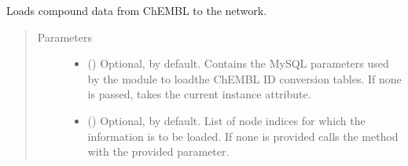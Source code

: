 \documentclass[letterpaper,10pt,english]{sphinxmanual}
\begin{document}
\begin{fulllineitems}

\begin{fulllineitems}
\label{\detokenize{reference:pypath.main.PyPath.complexes}}
\end{fulllineitems}


\begin{fulllineitems}
\label{\detokenize{reference:pypath.main.PyPath.complexes_in_network}}
\end{fulllineitems}


\begin{fulllineitems}
\label{\detokenize{reference:pypath.main.PyPath.compounds_from_chembl}}
Loads compound data from ChEMBL to the network.
\begin{quote}\begin{description}
\item[{Parameters}] \leavevmode\begin{itemize}
\item {} 
 () \textendash{} Optional,  by default. Contains the MySQL parameters
used by the  module to loadthe
ChEMBL ID conversion tables. If none is passed, takes the
current instance 
attribute.

\item {} 
 () \textendash{} Optional,  by default. List of node indices for
which the information is to be loaded. If none is provided
calls the method {\hyperref[\detokenize{reference:pypath.main.PyPath.get_sub}]{}} with
the provided  parameter.


\end{itemize}
\end{description}
\end{quote}
\end{fulllineitems}
\end{fulllineitems}
\end{document}
